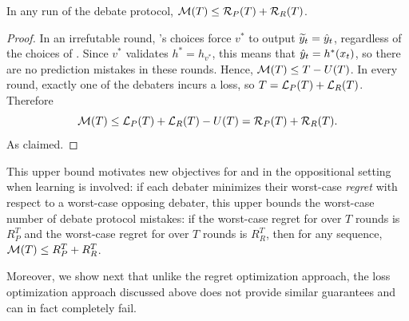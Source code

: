 \documentclass[anon]{alt2027} %
\begin{document}







\begin{claim}\label{claim:regret}
In any run of the debate protocol,  ${\mathcal M}(T) \leq {{\mathcal R}_P}(T) + {{\mathcal R}_R}(T)$.
\end{claim}
\begin{proof}
In an irrefutable round,  \dt's choices force $v^*$ to output ${\widetilde{y}}_t = {\hat{y}}_t$, regardless of the choices of \df. Since $v^*$ validates $h^* = h_{v^*}$, this means that ${\hat{y}}_t=h^*(x_t)$, so there are no prediction mistakes in these rounds. Hence, ${\mathcal M}(T) \leq T-U(T)$. In every round, exactly one of the debaters incurs a loss, so
$T =  {{\mathcal L}_P}(T)+{{\mathcal L}_R}(T)$. Therefore
\[
{\mathcal M}(T) \leq {{\mathcal L}_P}(T)+{{\mathcal L}_R}(T)-U(T) = {{\mathcal R}_P}(T) + {{\mathcal R}_R}(T).
\]
As claimed.
\end{proof}

This upper bound motivates new objectives for \dt and \df in the oppositional setting when learning is involved: if each debater minimizes their worst-case \emph{regret} with respect to a worst-case opposing debater, this upper bounds the worst-case number of debate protocol mistakes: if the worst-case regret for \dt over $T$ rounds is $R_P^T$ and the worst-case regret for \df  over $T$ rounds is $R_R^T$, then for any sequence, ${\mathcal M}(T) \leq R_P^T+ R_R^T$.






Moreover, we show next that unlike the regret optimization approach, the loss optimization approach discussed above does not provide similar guarantees and can in fact completely fail. 
\end{document}

